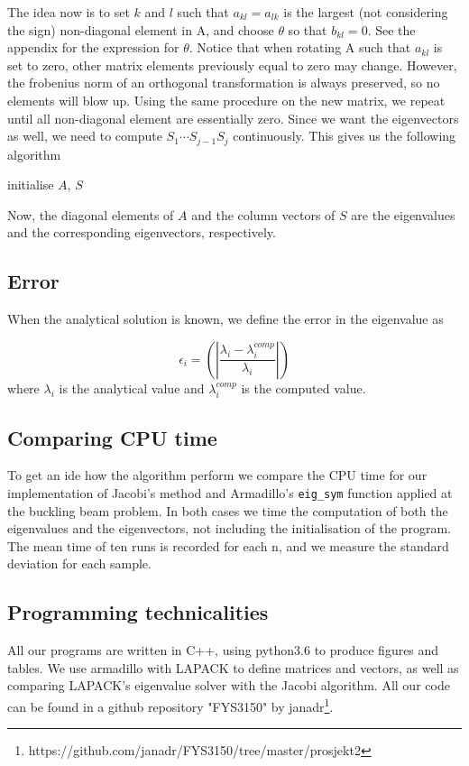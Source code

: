  The idea now is to set $k$ and $l$ such that $a_{kl}=a_{lk}$ is the largest (not considering the sign) non-diagonal element in A, and choose $\theta$ so that $b_{kl}=0$. See the appendix for the expression for $\theta$.
Notice that when rotating A such that $a_{kl}$ is set to zero, other matrix elements previously equal to zero may change. However, the frobenius norm of an orthogonal transformation is always
preserved, so no elements will blow up.
Using the same procedure on the new matrix, we repeat until all non-diagonal element are essentially zero. Since we want the eigenvectors as well, we need to compute $S_1 \cdots S_{j-1}S_j$ continuously. This gives us the following algorithm
\begin{algorithm}[h!]
	\SetAlgoLined
	initialise $A$, $S$\;
\end{algorithm}

\noindent Now, the diagonal elements of $A$ and the column vectors of $S$ are the eigenvalues and the corresponding eigenvectors, respectively.

\subsection{Error}
\label{sec:error}

When the analytical solution is known, we define the error in the eigenvalue as

\begin{equation}
\epsilon_i=\left(\left|\frac{\lambda_i-\lambda_i^{comp}}{\lambda_i}\right|\right)
\end{equation}
where $\lambda_i$ is the analytical value and $\lambda_i^{comp}$ is the computed value.
\subsection{Comparing CPU time}
To get an ide how the algorithm perform we compare the CPU time for our implementation of Jacobi's method and Armadillo's \texttt{eig\_sym} function applied at the buckling beam problem. In both cases we time the computation of both the eigenvalues and the eigenvectors, not including the initialisation of the program. The mean time of ten runs is recorded for each n, and
we measure the standard deviation for each sample.
\subsection{Programming technicalities}
\label{sec:progtech}

All our programs are written in C++, using python3.6 to produce figures and tables.
We use armadillo with LAPACK to define matrices and vectors, as well as comparing
LAPACK's eigenvalue solver with the Jacobi algorithm. All our code can be found in
a github repository "FYS3150" by janadr\footnote{https://github.com/janadr/FYS3150/tree/master/prosjekt2}.
